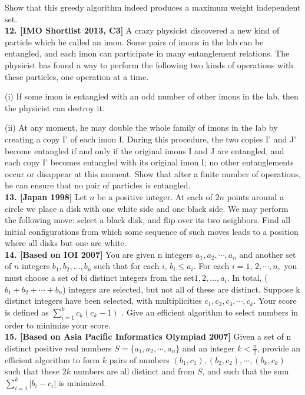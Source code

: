 \documentclass[a4paper,11pt]{book}
\begin{document}
Show that this greedy algorithm indeed produces a maximum
weight independent set.\\
\textbf{ 12. [IMO Shortlist 2013, C3]}
A crazy physicist discovered a new kind of particle which he
called an imon. Some pairs of imons in the lab can be
entangled, and each imon can participate in many
entanglement relations. The physicist has found a way to
perform the following two kinds of operations with these
particles, one operation at a time.
\par\noindent(i) If some imon is entangled with an odd number of other
imons in the lab, then the physicist can destroy it.
\par\noindent(ii) At any moment, he may double the whole family of imons
in the lab by creating a copy I’ of each imon I. During this
procedure, the two copies I’ and J’ become entangled if and
only if the original imons I and J are entangled, and each
copy I’ becomes entangled with its original imon I; no
other entanglements occur or disappear at this moment.
Show that after a finite number of operations, he can ensure
that no pair of particles is entangled.\\
\textbf{ 13. [Japan 1998]}
Let $n$ be a positive integer. At each of $2n$ points around a circle
we place a disk with one white side and one black side. We
may perform the following move: select a black disk, and flip
over its two neighbors. Find all initial configurations from
which some sequence of such moves leads to a position where
all disks but one are white.\\
\textbf{ 14. [Based on IOI 2007]}
You are given n integers $a_1, a_2, \cdots, a_n$ and another set of $n$
integers $b_1, b_2, …, b_n$ such that for each $i$, $b_i \le a_i$. For each $i = 1$,
$2, \cdots, n,$ you must choose a set of bi distinct integers from the
set$ {1, 2, …, a_i}$. In total, ($b_1 + b_2 +\cdots+ b_n$) integers are selected,
but not all of these are distinct. Suppose k distinct integers
have been selected, with multiplicities $c_1, c_2, c_3, \cdots, c_k$. Your
score is defined as $\sum_{i=1}^{k} c_{k}(c_{k} -1)$ . Give an efficient algorithm
to select numbers in order to minimize your score.\\
\textbf{15. [Based on Asia Pacific Informatics Olympiad 2007]}
Given a set of n distinct positive real numbers $S = \{a_1, a_2, \cdots, a_n\}$
and an integer $k < \frac{n}{2}$, provide an efficient algorithm to form $k$
pairs of numbers $(b_1, c_1), (b_2, c_2), \cdots, (b_k, c_k)$ such that these $2k$
numbers are all distinct and from $S$, and such that the sum $\sum_{i=1}^{k} |b_i - c_i|$ is minimized.
\end{document}

